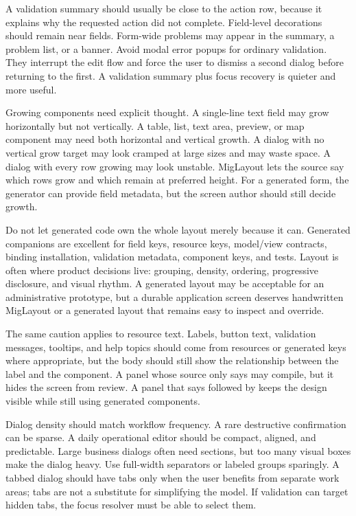 A validation summary should usually be close to the action row, because it
explains why the requested action did not complete. Field-level decorations
should remain near fields. Form-wide problems may appear in the summary, a
problem list, or a banner. Avoid modal error popups for ordinary validation.
They interrupt the edit flow and force the user to dismiss a second dialog
before returning to the first. A validation summary plus focus recovery is
quieter and more useful.

Growing components need explicit thought. A single-line text field may grow
horizontally but not vertically. A table, list, text area, preview, or map
component may need both horizontal and vertical growth. A dialog with no
vertical grow target may look cramped at large sizes and may waste space. A
dialog with every row growing may look unstable. MigLayout lets the source say
which rows grow and which remain at preferred height. For a generated form,
the generator can provide field metadata, but the screen author should still
decide growth.

Do not let generated code own the whole layout merely because it can. Generated
companions are excellent for field keys, resource keys, model/view contracts,
binding installation, validation metadata, component keys, and tests. Layout is
often where product decisions live: grouping, density, ordering, progressive
disclosure, and visual rhythm. A generated layout may be acceptable for an
administrative prototype, but a durable application screen deserves handwritten
MigLayout or a generated layout that remains easy to inspect and override.

The same caution applies to resource text. Labels, button text, validation
messages, tooltips, and help topics should come from resources or generated
keys where appropriate, but the body should still show the relationship between
the label and the component. A panel whose source only says
 may compile, but it hides the screen from
review. A panel that says  followed by
 keeps the design visible while still using
generated components.

Dialog density should match workflow frequency. A rare destructive
confirmation can be sparse. A daily operational editor should be compact,
aligned, and predictable. Large business dialogs often need sections, but too
many visual boxes make the dialog heavy. Use full-width separators or labeled
groups sparingly. A tabbed dialog should have tabs only when the user benefits
from separate work areas; tabs are not a substitute for simplifying the model.
If validation can target hidden tabs, the focus resolver must be able to select
them.

